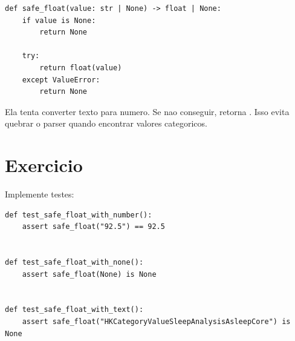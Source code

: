 \begin{lstlisting}[style=devbutterpython]
def safe_float(value: str | None) -> float | None:
    if value is None:
        return None

    try:
        return float(value)
    except ValueError:
        return None
\end{lstlisting}

Ela tenta converter texto para numero. Se nao conseguir, retorna . Isso evita quebrar o parser quando encontrar valores categoricos.

\section{Exercicio}

Implemente testes:

\begin{lstlisting}[style=devbutterpython]
def test_safe_float_with_number():
    assert safe_float("92.5") == 92.5


def test_safe_float_with_none():
    assert safe_float(None) is None


def test_safe_float_with_text():
    assert safe_float("HKCategoryValueSleepAnalysisAsleepCore") is None
\end{lstlisting}
